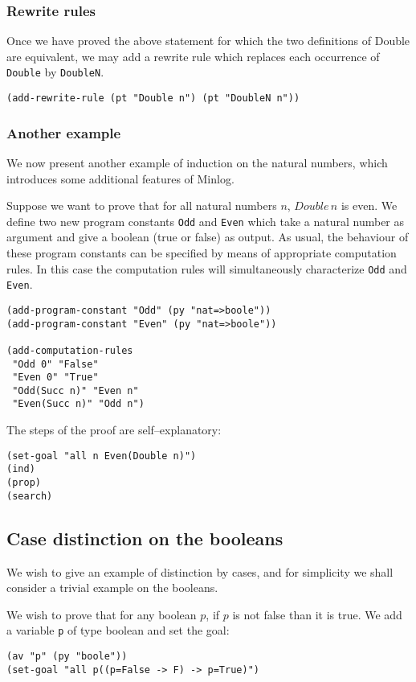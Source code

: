 \documentclass[12pt]{amsart}
\newcommand{\mi}{Minlog}
\begin{document}
\subsubsection{Rewrite rules}
Once we have proved the above statement for which the two definitions
of Double are equivalent, we may add a rewrite rule which replaces
each occurrence of \texttt{Double} by \texttt{DoubleN}.
\begin{verbatim}
(add-rewrite-rule (pt "Double n") (pt "DoubleN n"))
\end{verbatim}


\subsubsection{Another example}
\label{EvenOdd}
We now present another example of induction on the natural numbers,
which introduces some additional features of \mi.

Suppose we want to prove that for all natural numbers $n$, $Double\,
n$ is even.  We define two new program constants \texttt{Odd} and
\texttt{Even} which take a natural number as argument and give a
boolean (true or false) as output.  As usual, the behaviour of these
program constants can be specified by means of appropriate computation
rules. In this case the computation rules will simultaneously
characterize \texttt{Odd} and \texttt{Even}.
\begin{verbatim}
(add-program-constant "Odd" (py "nat=>boole"))
(add-program-constant "Even" (py "nat=>boole"))

(add-computation-rules
 "Odd 0" "False"
 "Even 0" "True"
 "Odd(Succ n)" "Even n"
 "Even(Succ n)" "Odd n")
\end{verbatim}

The steps of the proof are self--explanatory:
\begin{verbatim}
(set-goal "all n Even(Double n)")
(ind)
(prop)
(search)
\end{verbatim}


\subsection{Case distinction on the booleans}
We wish to give an example of distinction by cases, and for simplicity
we shall consider a trivial example on the booleans.

We wish to prove that for any boolean $p$, if $p$ is not false than it
is true.  We add a variable \texttt{p} of type boolean and set the
goal:
\begin{verbatim}
(av "p" (py "boole"))
(set-goal "all p((p=False -> F) -> p=True)")
\end{verbatim}
\end{document}
